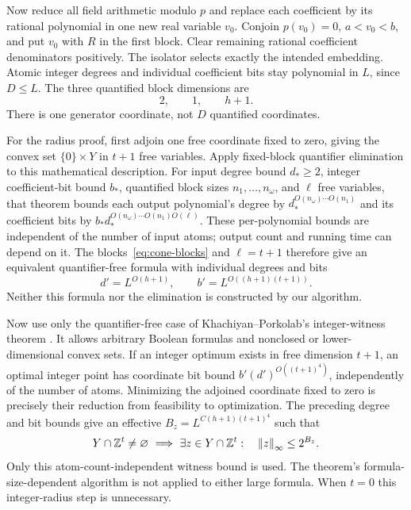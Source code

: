 Now reduce all field arithmetic modulo $p$ and replace each coefficient
by its rational polynomial in one new real variable $v_0$. Conjoin
$p(v_0)=0$, $a<v_0<b$, and put $v_0$ with $R$ in the first block.
Clear remaining rational coefficient denominators positively. The
isolator selects exactly the intended embedding. Atomic integer degrees
and individual coefficient bits stay polynomial in $L$, since $D\le L$.
The three quantified block dimensions are
\begin{equation}
\label{eq:cone-blocks}
 2,\qquad1,\qquad h+1.
\end{equation}
There is one generator coordinate, not $D$ quantified coordinates.

For the radius proof, first adjoin one free coordinate fixed to zero,
giving the convex set $\{0\}\times Y$ in $t+1$ free variables. Apply
fixed-block quantifier elimination
\cite[Theorem~2.27]{Basu2014} to this mathematical description. For
input degree bound $d_*\ge2$, integer coefficient-bit bound $b_*$, quantified
block sizes $n_1,\ldots,n_\omega$, and $\ell$ free variables, that
theorem bounds each output polynomial's degree by
$d_*^{O(n_\omega)\cdots O(n_1)}$ and its coefficient bits by
$b_*d_*^{O(n_\omega)\cdots O(n_1)O(\ell)}$.
These per-polynomial bounds are independent of the number of input
atoms; output count and running time can depend on it. The
blocks~\eqref{eq:cone-blocks} and $\ell=t+1$ therefore give an
equivalent quantifier-free formula with individual degrees and bits
\[
 d'=L^{O(h+1)},\qquad b'=L^{O((h+1)(t+1))}.
\]
Neither this formula nor the elimination is constructed by our algorithm.

Now use only the quantifier-free case of Khachiyan--Porkolab's
integer-witness theorem \cite[Theorem~1.1]{KhachiyanPorkolab2000}.
It allows arbitrary Boolean formulas and nonclosed or lower-dimensional
convex sets. If an integer optimum exists in free dimension $t+1$, an
optimal integer point has coordinate bit bound
$b'(d')^{O((t+1)^4)}$, independently of the number of atoms. Minimizing
the adjoined coordinate fixed to zero is precisely their reduction from
feasibility to optimization. The preceding degree and bit bounds give an
effective $B_z=L^{C(h+1)(t+1)^4}$ such that
\begin{equation}
\label{eq:cone-integer-radius}
 Y\cap\mathbb Z^t\ne\varnothing\ \Longrightarrow\
 \exists z\in Y\cap\mathbb Z^t:\quad\left\lVert z\right\rVert_\infty\le2^{B_z}.
\end{equation}
Only this atom-count-independent witness bound is used. The theorem's
formula-size-dependent algorithm is not applied to either large formula.
When $t=0$ this integer-radius step is unnecessary.

